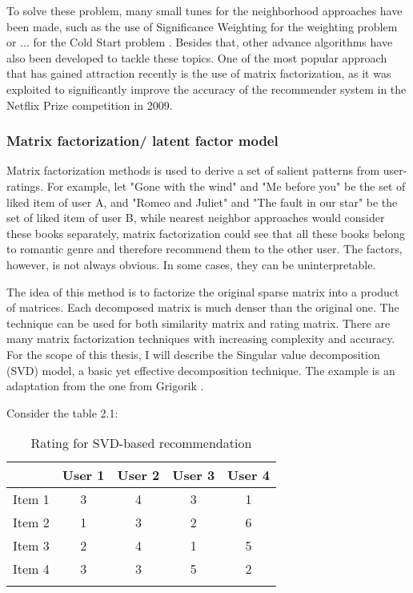To solve these problem, many small tunes for the neighborhood approaches have been made, such as the use of Significance Weighting \cite{} for the weighting problem or ... for the Cold Start problem \cite{}. Besides that, other advance algorithms have also been developed to tackle these topics. One of the most popular approach that has gained attraction recently is the use of matrix factorization, as it was exploited to significantly improve the accuracy of the recommender system in the Netflix Prize competition in 2009.

\subsubsection{Matrix factorization/ latent factor model}
Matrix factorization methods is used to derive a set of salient patterns from user-ratings. For example, let "Gone with the wind" and "Me before you" be the set of liked item of user A, and "Romeo and Juliet" and "The fault in our star" be the set of liked item of user B, while nearest neighbor approaches would consider these books separately, matrix factorization could see that all these books belong to romantic genre and therefore recommend them to the other user. The factors, however, is not always obvious. In some cases, they can be uninterpretable.

The idea of this method is to factorize the original sparse matrix into a product of matrices. Each decomposed matrix is much denser than the original one. The technique can be used for both similarity matrix and rating matrix. There are many matrix factorization techniques with increasing complexity and accuracy. For the scope of this thesis, I will describe the Singular value decomposition (SVD) model, a basic yet effective decomposition technique. The example is an adaptation from the one from Grigorik \cite{Grigorik2017}. 

Consider the table 2.1:

\begin{table}
\centering
\begin{tabular}{c c c c c}
\hline\hline
& User 1 & User 2 & User 3 & User 4 \\
\hline
Item 1 & 3 & 4 & 3 & 1 \\
Item 2 & 1 & 3 & 2 & 6 \\
Item 3 & 2 & 4 & 1 & 5 \\
Item 4 & 3 & 3 & 5 & 2 \\

\hline\hline \\
\end{tabular}
\caption{Rating for SVD-based recommendation}
\label{table:1}
\end{table}

